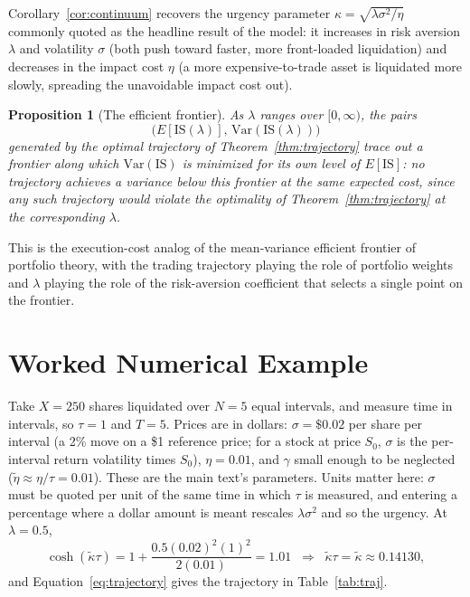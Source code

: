 \documentclass[11pt]{article}
\newtheorem{proposition}{Proposition}
\theoremstyle{remark}
\theoremstyle{definition}
\begin{document}
Corollary~\ref{cor:continuum} recovers the urgency parameter $\kappa=\sqrt{\lambda\sigma^2/\eta}$ commonly quoted as the headline result of the model: it increases in risk aversion $\lambda$ and volatility $\sigma$ (both push toward faster, more front-loaded liquidation) and decreases in the impact cost $\eta$ (a more expensive-to-trade asset is liquidated more slowly, spreading the unavoidable impact cost out).

\begin{proposition}[The efficient frontier]
\label{prop:frontier}
As $\lambda$ ranges over $[0,\infty)$, the pairs
\begin{equation*}
\big(E[\text{IS}(\lambda)],\,\mathrm{Var}(\text{IS}(\lambda))\big)
\end{equation*}
generated by the optimal trajectory of Theorem~\ref{thm:trajectory} trace out a frontier along which $\mathrm{Var}(\text{IS})$ is minimized for its own level of $E[\text{IS}]$: no trajectory achieves a variance below this frontier at the same expected cost, since any such trajectory would violate the optimality of Theorem~\ref{thm:trajectory} at the corresponding $\lambda$.
\end{proposition}

This is the execution-cost analog of the mean-variance efficient frontier of portfolio theory, with the trading trajectory playing the role of portfolio weights and $\lambda$ playing the role of the risk-aversion coefficient that selects a single point on the frontier.

\section{Worked Numerical Example}
\label{sec:example}

Take $X=250$ shares liquidated over $N=5$ equal intervals, and measure time in intervals, so $\tau=1$ and $T=5$. Prices are in dollars: $\sigma=\$0.02$ per share per interval (a 2\% move on a \$1 reference price; for a stock at price $S_0$, $\sigma$ is the per-interval return volatility times $S_0$), $\eta=0.01$, and $\gamma$ small enough to be neglected ($\tilde\eta\approx\eta/\tau=0.01$). These are the main text's parameters. Units matter here: $\sigma$ must be quoted per unit of the same time in which $\tau$ is measured, and entering a percentage where a dollar amount is meant rescales $\lambda\sigma^2$ and so the urgency. At $\lambda=0.5$,
\begin{equation*}
\cosh(\tilde\kappa\tau) = 1+\frac{0.5(0.02)^2(1)^2}{2(0.01)} = 1.01 \;\;\Rightarrow\;\; \tilde\kappa\tau=\tilde\kappa\approx0.14130,
\end{equation*}
and Equation~\eqref{eq:trajectory} gives the trajectory in Table~\ref{tab:traj}.
\end{document}
